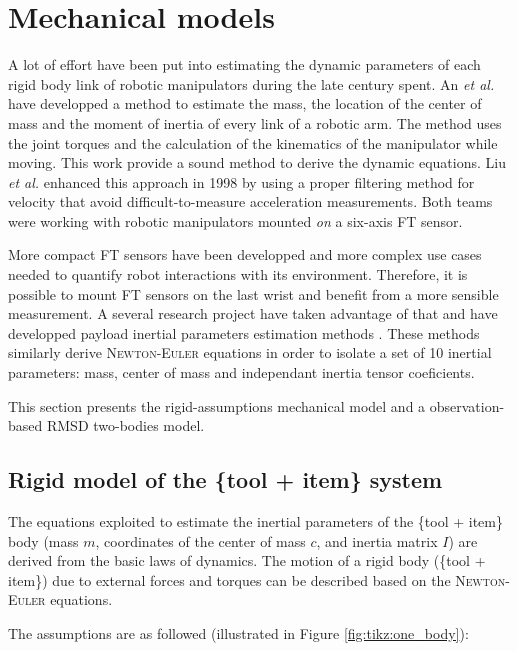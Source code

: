 \documentclass[/home/francois/latex/report/main.tex]{subfiles}
\begin{document}
\section{Mechanical models}
\label{section:mechanical-models}

A lot of effort have been put into estimating the dynamic parameters of each rigid body link of robotic manipulators during the late century spent. An \textit{et al.} \cite{An1985} have developped a method to estimate the mass, the location of the center of mass and the moment of inertia of every link of a robotic arm. The method uses the joint torques and the calculation of the kinematics of the manipulator while moving. This work provide a sound method to derive the dynamic equations. Liu \textit{et al.} enhanced this approach in 1998 \cite{Liu1998} by using a proper filtering method for velocity that avoid difficult-to-measure acceleration measurements. Both teams were working with robotic manipulators mounted \textit{on} a six-axis \ac{FT} sensor.

More compact \ac{FT} sensors have been developped and more complex use cases needed to quantify robot interactions with its environment. Therefore, it is possible to mount \ac{FT} sensors on the last wrist and benefit from a more sensible measurement. A several research project have taken advantage of that and have developped payload inertial parameters estimation methods \cite{Kubus2008, Kubus2007, Kubus2014, Farsoni2018}. These methods similarly derive \textsc{Newton-Euler} equations in order to isolate a set of 10 inertial parameters: mass, center of mass and independant inertia tensor coeficients.

This section presents the rigid-assumptions mechanical model and a observation-based \ac{RMSD} two-bodies model.

\subsection{Rigid model of the \{tool + item\} system}

The equations exploited to estimate the inertial parameters of the \{tool + item\} body (mass $m$, coordinates of the center of mass $c$, and inertia matrix $I$) are derived from the basic laws of dynamics. The motion of a rigid body (\{tool + item\}) due to external forces and torques can be described based on the \textsc{Newton-Euler} equations.

The assumptions are as followed (illustrated in Figure \ref{fig:tikz:one_body}):
\end{document}
